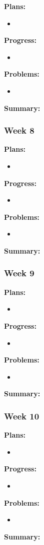 \noindent \textbf{Plans:}
\begin{itemize}
\item
\end{itemize}

\noindent \textbf{Progress:}
\begin{itemize}
\item
\end{itemize}

\noindent \textbf{Problems:}
\begin{itemize}
\item
\end{itemize}

\noindent \textbf{Summary:}

\subsubsection{Week 8}

\noindent \textbf{Plans:}
\begin{itemize}
\item
\end{itemize}

\noindent \textbf{Progress:}
\begin{itemize}
\item
\end{itemize}

\noindent \textbf{Problems:}
\begin{itemize}
\item
\end{itemize}

\noindent \textbf{Summary:}

\subsubsection{Week 9}

\noindent \textbf{Plans:}
\begin{itemize}
\item
\end{itemize}

\noindent \textbf{Progress:}
\begin{itemize}
\item
\end{itemize}

\noindent \textbf{Problems:}
\begin{itemize}
\item
\end{itemize}

\noindent \textbf{Summary:}

\subsubsection{Week 10}

\noindent \textbf{Plans:}
\begin{itemize}
\item
\end{itemize}

\noindent \textbf{Progress:}
\begin{itemize}
\item
\end{itemize}

\noindent \textbf{Problems:}
\begin{itemize}
\item
\end{itemize}

\noindent \textbf{Summary:}
